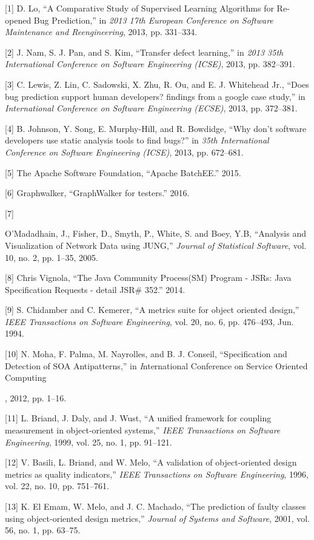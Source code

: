 
{[}1{]} D. Lo, ``A Comparative Study of Supervised Learning Algorithms for Re-opened Bug Prediction,'' in \emph{2013 17th European Conference on Software Maintenance and Reengineering}, 2013, pp. 331--334.

{[}2{]} J. Nam, S. J. Pan, and S. Kim, ``Transfer defect learning,'' in \emph{2013 35th International Conference on Software Engineering (ICSE)}, 2013, pp. 382--391.

{[}3{]} C. Lewis, Z. Lin, C. Sadowski, X. Zhu, R. Ou, and E. J. {Whitehead Jr.}, ``Does bug prediction support human developers? findings from a google case study,'' in \emph{International Conference on Software Engineering (ECSE)}, 2013, pp. 372--381.

{[}4{]} B. Johnson, Y. Song, E. Murphy-Hill, and R. Bowdidge, ``Why don't software developers use static analysis tools to find bugs?'' in \emph{35th International Conference on Software Engineering (ICSE)}, 2013, pp. 672--681.

{[}5{]} The Apache Software Foundation, ``Apache BatchEE.'' 2015.

{[}6{]} Graphwalker, ``GraphWalker for testers.'' 2016.

{[}7{]} {O’Madadhain, J., Fisher, D., Smyth, P., White, S. and Boey, Y.B, ``Analysis and Visualization of Network Data using JUNG,'' \emph{Journal of Statistical Software}, vol. 10, no. 2, pp. 1--35, 2005.

{[}8{]} Chris Vignola, ``The Java Community Process(SM) Program - JSRs: Java Specification Requests - detail JSR\# 352.'' 2014.

{[}9{]} S. Chidamber and C. Kemerer, ``A metrics suite for object oriented design,'' \emph{IEEE Transactions on Software Engineering}, vol. 20, no. 6, pp. 476--493, Jun. 1994.

{[}10{]} N. Moha, F. Palma, M. Nayrolles, and B. J. Conseil,
``Specification and Detection of SOA Antipatterns,'' in \emph International Conference on Service Oriented Computing}, 2012, pp. 1--16.

{[}11{]} L. Briand, J. Daly, and J. Wust, ``A unified framework for coupling measurement in object-oriented systems,'' \emph{IEEE Transactions on Software Engineering}, 1999, vol. 25, no. 1, pp. 91--121.

{[}12{]} V. Basili, L. Briand, and W. Melo, ``A validation of
object-oriented design metrics as quality indicators,'' \emph{IEEE Transactions on Software Engineering}, 1996, vol. 22, no. 10, pp. 751--761.

{[}13{]} K. {El Emam}, W. Melo, and J. C. Machado, ``The prediction of faulty classes using object-oriented design metrics,'' \emph{Journal of Systems and Software}, 2001, vol. 56, no. 1, pp. 63--75.

